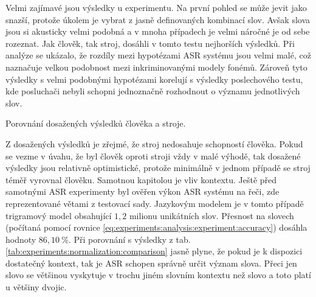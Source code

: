 Velmi zajímavé jsou výsledky u  experimentu. Na první pohled se může jevit jako snazší, protože úkolem je vybrat z jasně definovaných kombinací slov. Avšak slova jsou si akusticky velmi podobná a v mnoha případech je velmi náročné je od sebe rozeznat. Jak člověk, tak stroj, dosáhli v tomto testu nejhorších výsledků. Při analýze se ukázalo, že rozdíly mezi hypotézami ASR systému jsou velmi malé, což naznačuje velkou podobnost mezi inkriminovanými modely fonémů. Zároveň tyto výsledky s velmi podobnými hypotézami korelují s výsledky poslechového testu, kde posluchači nebyli schopni jednoznačně rozhodnout o významu jednotlivých slov.

\begin{table}[htpb]
  \centering
  \def\arraystretch{1.5}
  \caption{Porovnání dosažených výsledků člověka a stroje.}
  \label{tab:experiments:normalization:comparison}
\end{table}

Z dosažených výsledků je zřejmé, že stroj nedosahuje schopností člověka. Pokud se vezme v úvahu, že byl člověk oproti stroji vždy v malé výhodě, tak dosažené výsledky jsou relativně optimistické, protože minimálně v jednom případě se stroj téměř vyrovnal člověku. Samotnou kapitolou je vliv kontextu. Ještě před samotnými ASR experimenty byl ověřen výkon ASR systému na  řeči, zde reprezentované větami z testovací sady. Jazykovým modelem je v tomto případě trigramový model obsahující $1,2$ milionu unikátních slov. Přesnost na slovech (počítaná pomocí rovnice \ref{eq:experiments:analysis:experiment:accuracy}) dosáhla hodnoty $86,10\ \%$. Při porovnání s výsledky z tab. \ref{tab:experiments:normalization:comparison} jasně plyne, že pokud je k dispozici dostatečný kontext, tak je ASR schopen správně určit význam slova. Přeci jen slovo  se většinou vyskytuje v trochu jiném slovním kontextu než slovo  a toto platí u většiny dvojic.
